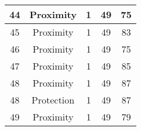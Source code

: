 \documentclass[results.tex]{subfiles}
\begin{document}
\begin{center}
\begin{tabular}{| c || c | c | c | c |}
            \hline
            44                      & Proximity                    & 1                      & 49                      & 75                   \\
            \hline
            45                      & Proximity                    & 1                      & 49                      & 83                   \\
            \hline
            46                      & Proximity                    & 1                      & 49                      & 75                   \\
            \hline
            47                      & Proximity                    & 1                      & 49                      & 85                   \\
            \hline
            48                      & Proximity                    & 1                      & 49                      & 87                   \\
            \hline
            48                      & Protection                   & 1                      & 49                      & 87                   \\
            \hline
            49                      & Proximity                    & 1                      & 49                      & 79                   \\
            \hline
        \end{tabular}
    \end{center}
\end{document}

